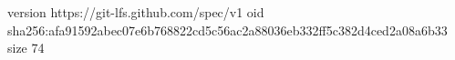 version https://git-lfs.github.com/spec/v1
oid sha256:afa91592abec07e6b768822cd5c56ac2a88036eb332ff5c382d4ced2a08a6b33
size 74
